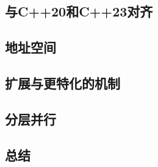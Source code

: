\documentclass[11pt,a4paper,UTF8]{ctexart}
\begin{document}
		\subsection{与C++20和C++23对齐}
		
		\subsection{地址空间}
		
		\subsection{扩展与更特化的机制}
		
		\subsection{分层并行}
		
		\subsection{总结}
		
\end{document}
